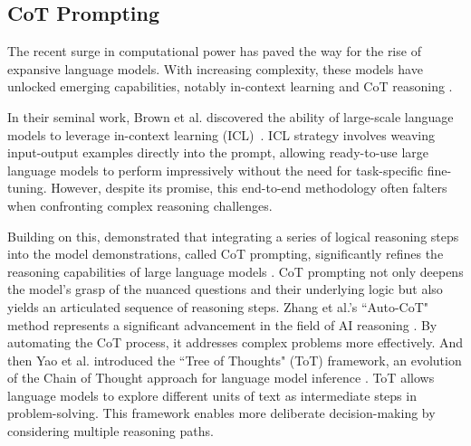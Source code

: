 \documentclass[11pt]{article}
\begin{document}
\subsection{CoT Prompting}
The recent surge in computational power has paved the way for the rise of expansive language models. With increasing complexity, these models have unlocked emerging capabilities, notably in-context learning and CoT reasoning \cite{wei2022chain,brown2020language,schaeffer2023emergent}.

In their seminal work, Brown et al. discovered the ability of large-scale language models to leverage in-context learning (ICL)~\cite{brown2020language}. ICL strategy involves weaving input-output examples directly into the prompt, allowing ready-to-use large language models to perform impressively without the need for task-specific fine-tuning. However, despite its promise, this end-to-end methodology often falters when confronting complex reasoning challenges.

Building on this, \citeauthor{wei2022chain} demonstrated that integrating a series of logical reasoning steps into the model demonstrations, called CoT prompting, significantly refines the reasoning capabilities of large language models \cite{wei2022chain}. CoT prompting not only deepens the model's grasp of the nuanced questions and their underlying logic but also yields an articulated sequence of reasoning steps. Zhang et al.'s ``Auto-CoT" method represents a significant advancement in the field of AI reasoning \cite{zhang2022automatic}. By automating the CoT process, it addresses complex problems more effectively. 
And then Yao et al. introduced the ``Tree of Thoughts" (ToT) framework, an evolution of the Chain of Thought approach for language model inference \cite{yao2023tree}. ToT allows language models to explore different units of text as intermediate steps in problem-solving. This framework enables more deliberate decision-making by considering multiple reasoning paths. 
\end{document}
